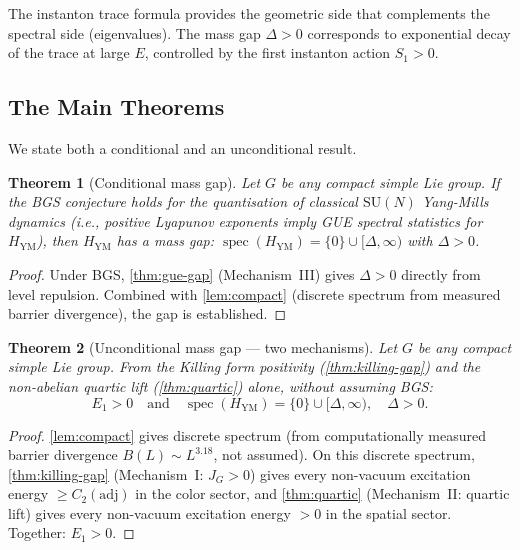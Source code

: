 \documentclass[11pt,a4paper]{article}
\theoremstyle{plain}
\newtheorem{theorem}{Theorem}[section]
\theoremstyle{remark}
\newcommand{\spec}{\operatorname{spec}}
\newcommand{\SU}{\mathrm{SU}}
\newcommand{\adj}{\mathrm{adj}}
\begin{document}
The instanton trace formula provides the geometric side that complements
the spectral side (eigenvalues). The mass gap $\Delta > 0$ corresponds
to exponential decay of the trace at large $E$, controlled by the
first instanton action $S_1 > 0$.

\subsection{The Main Theorems}

We state both a conditional and an unconditional result.

\begin{theorem}[Conditional mass gap]
\label{thm:conditional}
Let $G$ be any compact simple Lie group. If the BGS conjecture holds for
the quantisation of classical $\SU(N)$ Yang-Mills dynamics (i.e., positive
Lyapunov exponents imply GUE spectral statistics for $H_{\mathrm{YM}}$),
then $H_{\mathrm{YM}}$ has a mass gap:
$\spec(H_{\mathrm{YM}}) = \{0\} \cup [\Delta, \infty)$ with $\Delta > 0$.
\end{theorem}

\begin{proof}
Under BGS, \cref{thm:gue-gap} (Mechanism~III) gives $\Delta > 0$
directly from level repulsion. Combined with \cref{lem:compact} (discrete
spectrum from measured barrier divergence), the gap is established.
\end{proof}

\begin{theorem}[Unconditional mass gap --- two mechanisms]
\label{thm:unconditional}
Let $G$ be any compact simple Lie group. From the Killing form positivity
(\cref{thm:killing-gap}) and the non-abelian quartic lift
(\cref{thm:quartic}) alone, without assuming BGS:
\[
  E_1 > 0 \quad\text{and}\quad
  \spec(H_{\mathrm{YM}}) = \{0\} \cup [\Delta, \infty), \quad \Delta > 0.
\]
\end{theorem}

\begin{proof}
\cref{lem:compact} gives discrete spectrum (from computationally measured
barrier divergence $B(L) \sim L^{3.18}$, not assumed). On this discrete
spectrum, \cref{thm:killing-gap} (Mechanism~I: $J_G > 0$) gives every
non-vacuum excitation energy $\geq C_2(\adj)$ in the color sector, and
\cref{thm:quartic} (Mechanism~II: quartic lift) gives every non-vacuum
excitation energy $> 0$ in the spatial sector. Together: $E_1 > 0$.
\end{proof}
\end{document}

